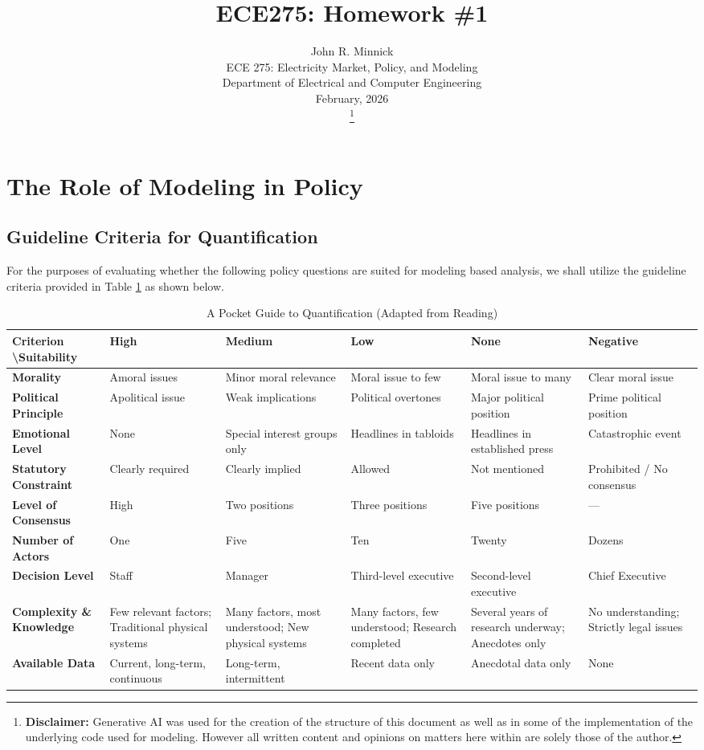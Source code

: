 \documentclass[journal, onecolumn, 12pt]{IEEEtran}
\title{ECE275: Homework \#1}
\author{John R. Minnick\\
ECE 275: Electricity Market, Policy, and Modeling \\
Department of Electrical and Computer Engineering\\
February, 2026\\
\thanks{\textbf{Disclaimer:} Generative AI was used for the creation of the structure of this document as well as in some of the implementation of the underlying code used for modeling. However all written content and opinions on matters here within are solely those of the author.}
}
\begin{document}
\maketitle

\section{The Role of Modeling in Policy }

\subsection{Guideline Criteria for Quantification}

For the purposes of evaluating whether the following policy questions are suited for modeling based analysis, we shall utilize the guideline criteria provided in Table \ref{tab:pocket_guide} as shown below.
    
\begin{table}[h]
\caption{A Pocket Guide to Quantification (Adapted from Reading)}
\label{tab:pocket_guide}
\centering
\begin{tabular}{@{}p{2.5cm}p{2.5cm}p{2.5cm}p{2.5cm}p{2.5cm}p{2.5cm}@{}}
\toprule
\textbf{Criterion \textbackslash Suitability} & \textbf{High } & \textbf{Medium} & \textbf{Low} & \textbf{None} & \textbf{Negative} \\ \midrule
\textbf{Morality} & Amoral issues & Minor moral relevance & Moral issue to few & Moral issue to many & Clear moral issue \\ \addlinespace
\textbf{Political Principle} & Apolitical issue & Weak implications & Political overtones & Major political position & Prime political position \\ \addlinespace
\textbf{Emotional Level} & None & Special interest groups only & Headlines in tabloids & Headlines in established press & Catastrophic event \\ \addlinespace
\textbf{Statutory Constraint} & Clearly required & Clearly implied & Allowed & Not mentioned & Prohibited / No consensus \\ \addlinespace
\textbf{Level of Consensus} & High & Two positions & Three positions & Five positions & --- \\ \addlinespace
\textbf{Number of Actors} & One & Five & Ten & Twenty & Dozens \\ \addlinespace
\textbf{Decision Level} & Staff & Manager & Third-level executive & Second-level executive & Chief Executive \\ \addlinespace
\textbf{Complexity \& Knowledge} & Few relevant factors; Traditional physical systems & Many factors, most understood; New physical systems & Many factors, few understood; Research completed & Several years of research underway; Anecdotes only & No understanding; Strictly legal issues \\ \addlinespace
\textbf{Available Data} & Current, long-term, continuous & Long-term, intermittent & Recent data only & Anecdotal data only & None \\ \bottomrule
\end{tabular}
\end{table}
\end{document}
